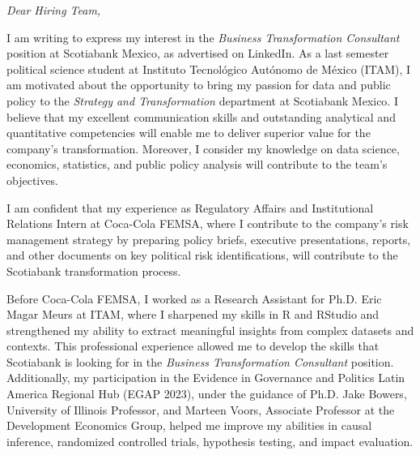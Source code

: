 \documentclass[10pt]{tufte-handout}
\begin{document}
{				          %

\vspace{1.5cm}


{\emph{Dear Hiring Team,}} 		%

\setlength{\parindent}{1cm}

\begin{fullwidth}
\vspace{.2cm}

I am writing to express my interest in the \emph{Business Transformation Consultant} position at Scotiabank Mexico, as advertised on LinkedIn. As a last semester political science student at Instituto Tecnológico Autónomo de México (ITAM), I am motivated about the opportunity to bring my passion for data and public policy to the \emph{Strategy and Transformation} department at Scotiabank Mexico. I believe that my excellent communication skills and outstanding analytical and quantitative competencies will enable me to deliver superior value for the company's transformation. Moreover, I consider my knowledge on data science, economics, statistics, and public policy analysis will contribute to the team's objectives.

\vspace{.2cm}

I am confident that my experience as Regulatory Affairs and Institutional Relations Intern at Coca-Cola FEMSA, where I contribute to the company's risk management strategy by preparing policy briefs, executive presentations, reports, and other documents on key political risk identifications, will contribute to the Scotiabank transformation process.

\vspace{.2cm}

Before Coca-Cola FEMSA, I worked as a Research Assistant for Ph.D. Eric Magar Meurs at ITAM, where I sharpened my skills in R and RStudio and strengthened my ability to extract meaningful insights from complex datasets and contexts. This professional experience allowed me to develop the skills that Scotiabank is looking for in the \emph{Business Transformation Consultant} position. Additionally, my participation in the Evidence in Governance and Politics Latin America Regional Hub (EGAP 2023), under the guidance of Ph.D. Jake Bowers, University of Illinois Professor, and Marteen Voors, Associate Professor at the Development Economics Group, helped me improve my abilities in causal inference, randomized controlled trials, hypothesis testing, and impact evaluation.


\end{fullwidth}}
\end{document}

